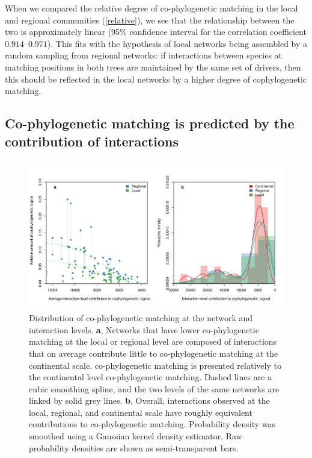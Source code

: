 \documentclass[12pt]{article}
\begin{document}
When we compared the relative degree of co-phylogenetic matching in the
local and regional communities (\autoref{relative}), we see that the
relationship between the two is approximately linear (95\% confidence
interval for the correlation coefficient \(0.914\)--\(0.971\)). This
fits with the hypothesis of local networks being assembled by a random
sampling from regional networks: if interactions between species at
matching positions in both trees are maintained by the same set of
drivers, then this should be reflected in the local networks by a higher
degree of cophylogenetic matching.

\subsection{Co-phylogenetic matching is predicted by the contribution of
interactions}\label{co-phylogenetic-matching-is-predicted-by-the-contribution-of-interactions}

\begin{no-prefix-figure-caption}

\begin{figure}[htbp]
\centering
\includegraphics[width=1.00000\textwidth]{figures/figure4.pdf}
\caption{Distribution of co-phylogenetic matching at the network and
interaction levels. \textbf{a}, Networks that have lower co-phylogenetic
matching at the local or regional level are composed of interactions
that on average contribute little to co-phylogenetic matching at the
continental scale. co-phylogenetic matching is presented relatively to
the continental level co-phylogenetic matching. Dashed lines are a cubic
smoothing spline, and the two levels of the same networks are linked by
solid grey lines. \textbf{b}, Overall, interactions observed at the
local, regional, and continental scale have roughly equivalent
contributions to co-phylogenetic matching. Probability density was
smoothed using a Gaussian kernel density estimator. Raw probability
densities are shown as semi-transparent bars.}\label{fg:contributions}
\end{figure}

\end{no-prefix-figure-caption}
\end{document}
